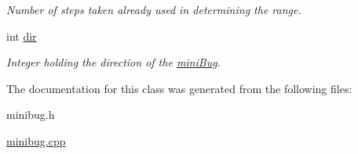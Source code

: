 \begin{DoxyCompactItemize}
\begin{DoxyCompactList}\small\item\em Number of steps taken already used in determining the range. \end{DoxyCompactList}\item 
\hypertarget{classminiBug_a41ac911a268d263e14ab345b1376d53a}{int \hyperlink{classminiBug_a41ac911a268d263e14ab345b1376d53a}{dir}}\label{classminiBug_a41ac911a268d263e14ab345b1376d53a}

\begin{DoxyCompactList}\small\item\em Integer holding the direction of the \hyperlink{classminiBug}{mini\-Bug}. \end{DoxyCompactList}\end{DoxyCompactItemize}


The documentation for this class was generated from the following files\-:\begin{DoxyCompactItemize}
\item 
minibug.\-h\item 
\hyperlink{minibug_8cpp}{minibug.\-cpp}\end{DoxyCompactItemize}
